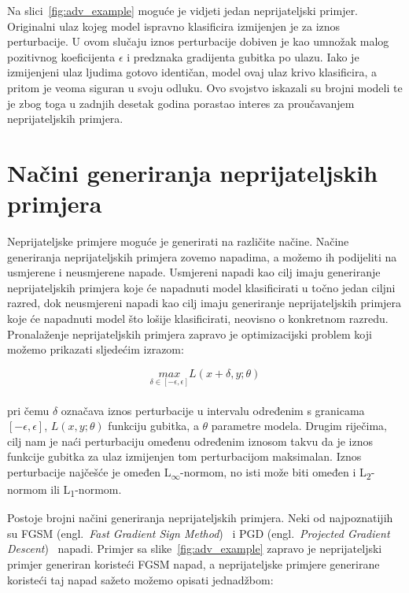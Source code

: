 \documentclass[times, utf8, zavrsni, numeric]{fer}
\begin{document}
Na slici~\ref{fig:adv_example} moguće je vidjeti jedan neprijateljski primjer.
Originalni ulaz kojeg model ispravno klasificira izmijenjen je za iznos perturbacije.
U ovom slučaju iznos perturbacije dobiven je kao umnožak malog pozitivnog koeficijenta $\epsilon$ i predznaka gradijenta gubitka po ulazu.
Iako je izmijenjeni ulaz ljudima gotovo identičan, model ovaj ulaz krivo klasificira, a pritom je veoma siguran u svoju odluku.
Ovo svojstvo iskazali su brojni modeli te je zbog toga u zadnjih desetak godina porastao interes za proučavanjem neprijateljskih primjera.

\section{Načini generiranja neprijateljskih primjera}

Neprijateljske primjere moguće je generirati na različite načine. 
Načine generiranja neprijateljskih primjera zovemo napadima, a možemo ih podijeliti na usmjerene i neusmjerene napade.
Usmjereni napadi kao cilj imaju generiranje neprijateljskih primjera koje će napadnuti model klasificirati u točno jedan ciljni razred,
dok neusmjereni napadi kao cilj imaju generiranje neprijateljskih primjera koje će napadnuti model što lošije klasificirati, neovisno o konkretnom razredu.
Pronalaženje neprijateljskih primjera zapravo je optimizacijski problem koji možemo prikazati sljedećim izrazom:

\begin{equation}
    \underset{\delta \in [-\epsilon, \epsilon]}{max}L(x + \delta,y;\theta)
    \label{eq:adversarial_optimization}
\end{equation}
\\
pri čemu $\delta$ označava iznos perturbacije u intervalu određenim s granicama $[-\epsilon, \epsilon]$, $L(x,y;\theta)$ funkciju gubitka, a $\theta$ parametre modela.
Drugim riječima, cilj nam je naći perturbaciju omeđenu određenim iznosom takvu da je iznos funkcije gubitka za ulaz izmijenjen tom perturbacijom maksimalan.
Iznos perturbacije najčešće je omeđen L\textsubscript{$\infty$}-normom, no isti može biti omeđen i L\textsubscript{2}-normom ili L\textsubscript{1}-normom.

Postoje brojni načini generiranja neprijateljskih primjera. 
Neki od najpoznatijih su FGSM (engl.\ \textit{Fast Gradient Sign Method})~\cite{goodfellow2014explaining} i PGD (engl.\ \textit{Projected Gradient Descent})~\cite{madry2017towards} napadi.
Primjer sa slike~\ref{fig:adv_example} zapravo je neprijateljski primjer generiran koristeći FGSM napad, a neprijateljske primjere generirane koristeći taj napad sažeto možemo opisati jednadžbom:
\end{document}

